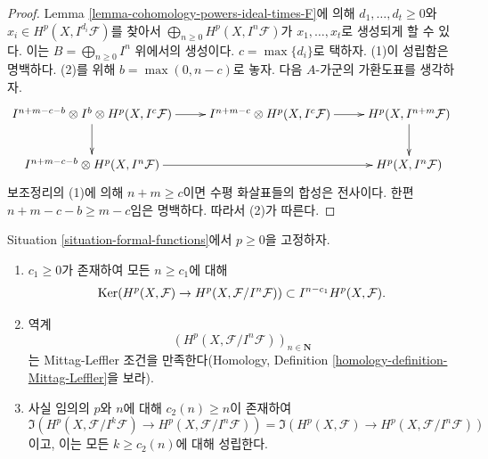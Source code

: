 \begin{proof}
Lemma \ref{lemma-cohomology-powers-ideal-times-F}에 의해
$d_1, \ldots, d_t \geq 0$와
$x_i \in H^p(X, I^{d_i}\mathcal{F})$를 찾아서
$\bigoplus_{n \geq 0} H^p(X, I^n\mathcal{F})$가
$x_1, \ldots, x_t$로 생성되게 할 수 있다. 이는
$B = \bigoplus_{n \geq 0} I^n$ 위에서의 생성이다.
$c = \max\{d_i\}$로 택하자. (1)이 성립함은 명백하다.
(2)를 위해 $b = \max(0, n - c)$로 놓자. 다음 $A$-가군의 가환도표를
생각하자.
$$
\xymatrix{
I^{n + m - c - b} \otimes I^b \otimes
H^p(X, I^c\mathcal{F}) \ar[r] \ar[d] &
I^{n + m - c} \otimes H^p(X, I^c\mathcal{F}) \ar[r] &
H^p(X, I^{n + m}\mathcal{F}) \ar[d] \\
I^{n + m - c - b} \otimes H^p(X, I^n\mathcal{F}) \ar[rr] & &
H^p(X, I^n\mathcal{F})
}
$$
보조정리의 (1)에 의해 $n + m \geq c$이면 수평 화살표들의 합성은
전사이다. 한편 $n + m - c - b \geq m - c$임은 명백하다. 따라서
(2)가 따른다.
\end{proof}

\begin{lemma}
\label{lemma-ML-cohomology-powers-ideal}
Situation \ref{situation-formal-functions}에서 $p \geq 0$을 고정하자.
\begin{enumerate}
\item $c_1 \geq 0$가 존재하여 모든 $n \geq c_1$에 대해
$$
\mathop{\mathrm{Ker}}(
H^p(X, \mathcal{F}) \to H^p(X, \mathcal{F}/I^n\mathcal{F})
)
\subset
I^{n - c_1}H^p(X, \mathcal{F}).
$$
\item 역계
$$
\left(H^p(X, \mathcal{F}/I^n\mathcal{F})\right)_{n \in \mathbf{N}}
$$
는 Mittag-Leffler 조건을 만족한다(Homology, Definition
\ref{homology-definition-Mittag-Leffler}을 보라).
\item 사실 임의의 $p$와 $n$에 대해 $c_2(n) \geq n$이 존재하여
$$
\Im(H^p(X, \mathcal{F}/I^k\mathcal{F})
\to H^p(X, \mathcal{F}/I^n\mathcal{F}))
=
\Im(H^p(X, \mathcal{F})
\to H^p(X, \mathcal{F}/I^n\mathcal{F}))
$$
이고, 이는 모든 $k \geq c_2(n)$에 대해 성립한다.
\end{enumerate}
\end{lemma}

